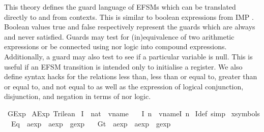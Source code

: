 %
\begin{isabellebody}%
%
%
\isadelimdocument
%
\endisadelimdocument
%
\isatagdocument
%
\isamarkuptrue%
%
\endisatagdocument
{\isafolddocument}%
%
\isadelimdocument
%
\endisadelimdocument
%
\begin{isamarkuptext}%
This theory defines the guard language of EFSMs which can be translated directly to and from
contexts. This is similar to boolean expressions from IMP \cite{fixme}. Boolean values true and
false respectively represent the guards which are always and never satisfied. Guards may test
for (in)equivalence of two arithmetic expressions or be connected using nor logic into compound
expressions. Additionally, a guard may also test to see if a particular variable is null. This is
useful if an EFSM transition is intended only to initialise a register.  We also define syntax hacks
for the relations less than, less than or equal to, greater than or equal to, and not equal to as
well as the expression of logical conjunction, disjunction, and negation in terms of nor logic.%
\end{isamarkuptext}\isamarkuptrue%
%
\isadelimtheory
%
\endisadelimtheory
%
\isatagtheory
{}\isamarkupfalse%
\ GExp\isanewline
{}\ AExp\ Trilean\isanewline
{}%
\endisatagtheory
{\isafoldtheory}%
%
\isadelimtheory
%
\endisadelimtheory
\isanewline
\isanewline
{}\isamarkupfalse%
\ I\ {\isacharcolon}{\isacharcolon}\ {\isachardoublequoteopen}nat\ {\isasymRightarrow}\ vname{\isachardoublequoteclose}\ \isanewline
\ \ {\isachardoublequoteopen}I\ n\ {\isacharequal}\ vname{\isachardot}I\ {\isacharparenleft}n{\isacharminus}{}{\isacharparenright}{\isachardoublequoteclose}\isanewline
{}\isamarkupfalse%
\ I{\isacharunderscore}def\ {\isacharbrackleft}simp{\isacharbrackright}%
\isamarkupfalse%
\ {\isacharparenleft}xsymbols{\isacharparenright}\isanewline
\ \ Eq\ {\isacharcolon}{\isacharcolon}\ {\isachardoublequoteopen}aexp\ {\isasymRightarrow}\ aexp\ {\isasymRightarrow}\ gexp{\isachardoublequoteclose}\ \isanewline
\ \ Gt\ {\isacharcolon}{\isacharcolon}\ {\isachardoublequoteopen}aexp\ {\isasymRightarrow}\ aexp\ {\isasymRightarrow}\ gexp{\isachardoublequoteclose}\ \isanewline

\end{isabellebody}
